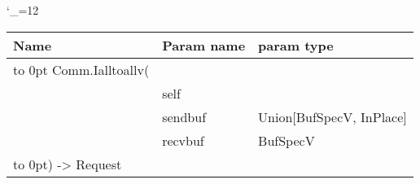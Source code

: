 \begingroup \catcode`\_=12 \tt
\begin{tabular}{lll}
\toprule
\textrm{Name}&\textrm{Param name}&\textrm{param type}\\
\midrule
\hbox to 0pt {Comm.Ialltoallv(\hss}\\
& self\\
& sendbuf & Union[BufSpecV, InPlace]\\
& recvbuf & BufSpecV\\
\hbox to 0pt{) -> Request\hss}\\
\bottomrule
\end{tabular}
\endgroup
